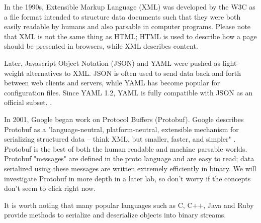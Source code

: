 In the 1990s, Extensible Markup Language (XML) was developed by the W3C as a file format intended to structure data documents such that they were both easily readable by humans and also parsable in computer programs. Please note that XML is not the same thing as HTML; HTML is used to describe how a page should be presented in browsers, while XML describes content.


Later, Javascript Object Notation (JSON) and YAML were pushed as light-weight alternatives to XML. JSON is often used to send data back and forth between web clients and servers, while YAML has become popular for configuration files. Since YAML 1.2, YAML is fully compatible with JSON as an official subset. \cite{ben-kiki_evans_net_2009}. 

In 2001, Google began work on Protocol Buffers (Protobuf). Google describes Protobuf as a "language-neutral, platform-neutral, extensible mechanism for serializing structured data – think XML, but smaller, faster, and simpler" \cite{google_protobuf}. Protobuf is the best of both the human readable and machine parsable worlds. Protobuf "messages" are defined in the proto language and are easy to read; data serialized using these messages are written extremely efficiently in binary. We will investigate Protobuf in more depth in a later lab, so don't worry if the concepts don't seem to click right now.

It is worth noting that many popular languages such as C, C++, Java and Ruby provide methods to serialize and deserialize objects into binary streams. 






